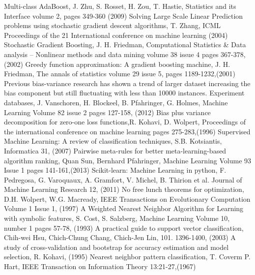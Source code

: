 \documentclass[a4paper,10pt]{article}
\begin{document}
\begin{thebibliography}{9}
 Multi-class AdaBoost, J. Zhu, S. Rosset, H. Zou, T. Hastie, Statistics and its Interface volume 2, pages 349-360 (2009)
 Solving Large Scale Linear Prediction problems using stochastic gradient descent algorithms, T. Zhang, ICML Proceedings of the 21 International conference on machine learning (2004)
 Stochastic Gradient Boosting, J. H. Friedman,  Computational Statistics \& Data analysis – Nonlinear methods and data mining volume 38 issue 4 pages 367-378,(2002)
 Greedy function approximation: A gradient boosting machine, J. H. Friedman, The annals of statistics volume 29 issue 5, pages 1189-1232,(2001)
Previous bias-variance research has shown a trend of larger dataset increasing the bias component but still fluctuating with  less than 10000 instances.
 Experiment databases, J. Vanschoren, H. Blockeel, B. Pfahringer, G. Holmes, Machine Learning Volume 82 issue 2 pages 127-158, (2012)
 Bias plus variance decomposition for zero-one loss functions,R. Kohavi, D. Wolpert, Proceedings of the international conference on machine learning pages 275-283,(1996)
 Supervised Machine Learning: A review of classification techniques, S.B. Kotsiantis, Informatica 31, (2007)
 Pairwise meta-rules for better meta-learning-based algorithm ranking, Quan Sun, Bernhard Pfahringer, Machine Learning Volume 93 Issue 1 pages 141-161,(2013)
 Scikit-learn: Machine Learning in python, F. Pedregosa, G. Varoquaux, A. Gramfort, V. Michel, B. Thirion et al. Journal of Machine Learning Research 12, (2011)
 No free lunch theorems for optimization, D.H. Wolpert, W.G. Macready, IEEE Transactions on Evolutionary Computation Volume 1 Issue 1, (1997)
 A Weighted Nearest Neighbor Algorithm for Learning with symbolic features, S. Cost, S. Salzberg, Machine Learning Volume 10, number 1 pages 57-78, (1993)
 A practical guide to support vector classification, Chih-wei Hsu, Chich-Chung Chang, Chich-Jen Lin, 101. 1396-1400, (2003)
 A study of cross-validation and bootstrap for accuracy estimation and model selection, R. Kohavi, (1995)
 Nearest neighbor pattern classification, T. Coverm P. Hart, IEEE Transaction on Information Theory 13:21-27,(1967)




 
     
\end{thebibliography}
\endgroup
\end{document}
